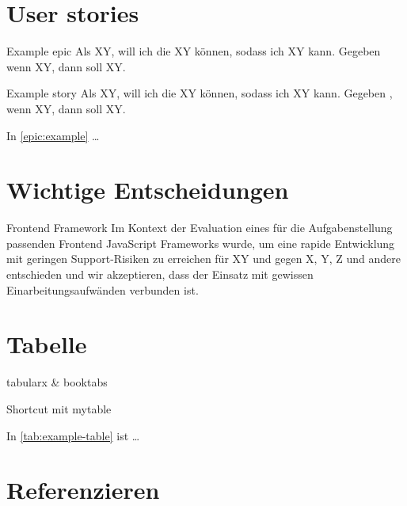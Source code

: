 \section{User stories}


\begin{scrumepic}[label=epic:example]{Example epic}
	Als XY, will ich die XY können, sodass ich XY kann.
	\storyacceptance	
	Gegeben
	wenn XY, dann soll XY.
\end{scrumepic}

\begin{scrumstory}[label=story:example]{Example story}
	Als XY, will ich die XY können, sodass ich XY kann.
	\storyacceptance	
	Gegeben
	,
	wenn XY, dann soll XY.
\end{scrumstory}


In \cref{epic:example} \dots


\section{Wichtige Entscheidungen}
\begin{decision}{Frontend Framework}
	Im Kontext der Evaluation eines für die Aufgabenstellung passenden Frontend JavaScript Frameworks wurde, um eine rapide Entwicklung mit geringen Support-Risiken zu erreichen für XY und gegen X, Y, Z und andere entschieden und wir akzeptieren, dass der Einsatz mit gewissen Einarbeitungsaufwänden verbunden ist.
\end{decision}


\section{Tabelle}

tabularx \& booktabs

Shortcut mit mytable


In \cref{tab:example-table} ist \dots


\section{Referenzieren}

